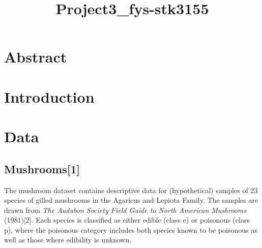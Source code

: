 \documentclass[11pt]{article}
\title{Project3\_fys-stk3155}
\begin{document}
    
    \maketitle
    
    

    
    \hypertarget{abstract}{%
\section{Abstract}\label{abstract}}

    

    \hypertarget{introduction}{%
\section{Introduction}\label{introduction}}

    

    \hypertarget{data}{%
\section{Data}\label{data}}

    \hypertarget{mushrooms}{%
\subsection{Mushrooms[1]}\label{mushrooms}}

The mushroom dataset contains descriptive data for (hypothetical)
samples of 23 species of gilled mushrooms in the Agaricus and Lepiota
Family. The samples are drawn from \emph{The Audubon Society Field Guide
to North American Mushrooms} (1981)[2]. Each species is classified as
either edible (class e) or poisonous (class p), where the poisonous
category includes both species known to be poisonous as well as those where edibility is unknown.
\end{document}
